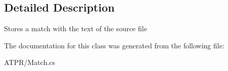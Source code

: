 \subsection{Detailed Description}
Stores a match with the text of the source file 



The documentation for this class was generated from the following file\+:\begin{DoxyCompactItemize}
\item 
A\+T\+P\+R/Match.\+cs\end{DoxyCompactItemize}
